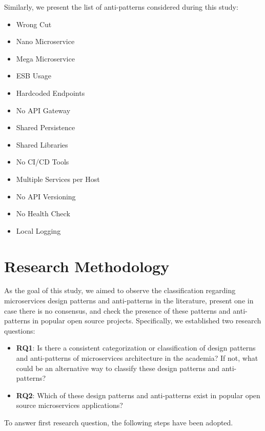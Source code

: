 \documentclass[11pt,a4paper,twocolumn]{article}
\begin{document}
Similarly, we present the list of anti-patterns considered during this study:

\begin{itemize}
    \item Wrong Cut
    \item Nano Microservice
    \item Mega Microservice
    \item ESB Usage
    \item Hardcoded Endpoints
    \item No API Gateway
    \item Shared Persistence
    \item Shared Libraries
    \item No CI/CD Tools
    \item Multiple Services per Host
    \item No API Versioning
    \item No Health Check
    \item Local Logging
\end{itemize}

\section{Research Methodology}
\label{sec:research_method}

As the goal of this study, we aimed to observe the classification regarding microservices design patterns and anti-patterns in the literature, present one in case there is no consensus, and check the presence of these patterns and anti-patterns in popular open source projects.
Specifically, we established two research questions:
\begin{itemize}
    \item \textbf{RQ1}: Is there a consistent categorization or classification of design patterns and anti-patterns of microservices architecture in the academia?
    If not, what could be an alternative way to classify these design patterns and anti-patterns?
    
    \item \textbf{RQ2}: Which of these design patterns and anti-patterns exist in popular open source microservices applications?
\end{itemize}

To answer first research question, the following steps have been adopted.
\end{document}
